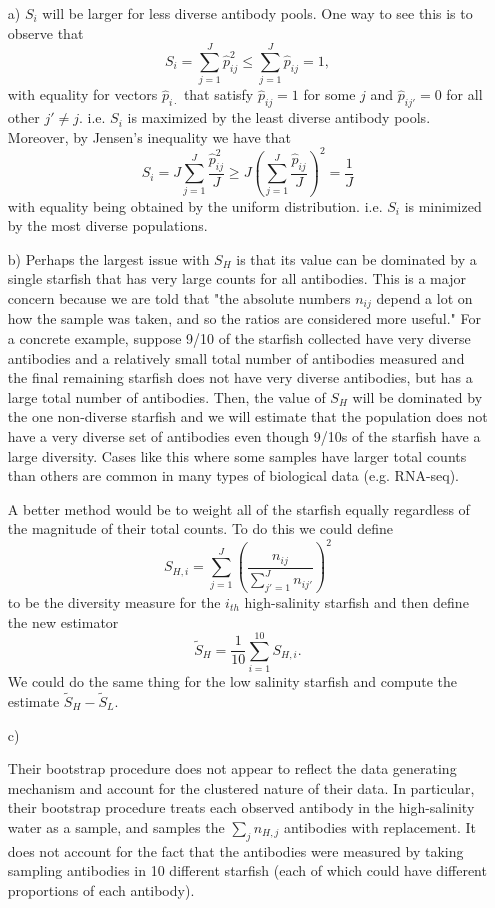 \begin{enumerate}
\item[a)]
$S_i$ will be larger for less diverse antibody pools. One way to see this is to observe that 
\[
S_i = \sum_{j=1}^J \hat{p}_{ij}^2 \leq \sum_{j=1}^J \hat{p}_{ij} = 1,
\] 
with equality for vectors $\hat{p}_{i \cdot}$ that satisfy $\hat{p}_{ij} = 1$ for some $j$ and $\hat{p}_{ij'} = 0$ for all other $j' \neq j$. i.e. $S_i$ is maximized by the least diverse antibody pools. Moreover, by Jensen's inequality we have that 
\[
S_i =  J  \sum_{j=1}^J \frac{\hat{p}_{ij}^2}{J} \geq J \left( \sum_{j=1}^J \frac{\hat{p}_{ij}}{J} \right)^2 = \frac{1}{J}
\]
with equality being obtained by the uniform distribution. i.e. $S_i$ is minimized by the most diverse populations. 
\item[b)]
Perhaps the largest issue with $S_H$ is that its value can be dominated by a single starfish that has very large counts for all antibodies. This is a major concern because we are told that "the absolute numbers $n_{ij}$ depend  a  lot  on  how  the  sample  was  taken,  and  so  the  ratios  are  considered  more useful." For a concrete example, suppose 9/10 of the starfish collected have very diverse antibodies and a relatively small total number of antibodies measured and the final remaining starfish does not have very diverse antibodies, but has a large total number of antibodies. Then, the value of $S_H$ will be dominated by the one non-diverse starfish and we will estimate that the population does not have a very diverse set of antibodies even though 9/10s of the starfish have a large diversity. Cases like this where some samples have larger total counts than others are common in many types of biological data (e.g. RNA-seq).

A better method would be to weight all of the starfish equally regardless of the magnitude of their total counts. To do this we could define 
\[
S_{H,i} = \sum_{j=1}^J \left( \frac{n_{ij}}{\sum_{j'=1}^J n_{ij'}} \right)^2
\]
to be the diversity measure for the $i_{th}$ high-salinity starfish and then define the new estimator 
\[
\tilde{S}_H = \frac{1}{10} \sum_{i=1}^{10} S_{H,i}.
\]
We could do the same thing for the low salinity starfish and compute the estimate $\tilde{S}_H - \tilde{S}_L$.

\item[c)]

Their bootstrap procedure does not appear to reflect the data generating mechanism and account for the clustered nature of their data. In particular, their bootstrap procedure treats each observed antibody in the high-salinity water as a sample, and samples the $\sum_j n_{H,j}$ antibodies with replacement. It does not account for the fact that the antibodies were measured by taking sampling antibodies in 10 different starfish (each of which could have different proportions of each antibody).


\end{enumerate}
